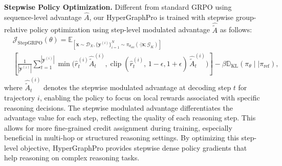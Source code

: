 

\noindent\textbf{Stepwise Policy Optimization.}
Different from standard GRPO using sequence-level advantage $\hat{A}$, our HyperGraphPro is trained with stepwise group-relative policy optimization using step-level modulated advantage $\hat{\tilde{A}}$ as follows:
\begin{equation}
\begin{split}
&\mathcal{J}_{\mathrm{StepGRPO}}(\theta)
= \mathbb{E}_{\left[\boldsymbol{x} \sim \mathcal{D}_X, \{\boldsymbol{y}^{(i)}\}_{i=1}^N \sim \pi_{\theta_{\text{old}}}(\cdot | \boldsymbol{x}; \mathcal{G}_K)\right]}
\\
&\left[
\frac{1}{\left\lvert\boldsymbol{y}^{(i)}\right\rvert}\sum_{t=1}^{\left\lvert \boldsymbol{y}^{(i)}\right\rvert}
\min\Big(
\hat{r}_{t}^{(i)}\hat{\tilde{A}}^{(i)}_t, \operatorname{clip}\!\left(\hat{r}_{t}^{(i)},\, 1 - \epsilon, 1+\epsilon \right)\,\hat{\tilde{{A}}}^{(i)}_t
\Big)
\right] -\beta \mathbb{D}_{\text{KL}}\left(\pi_\theta \mid\mid \pi_{\text{ref}} \right),
\end{split}
\end{equation}
where $\hat{\tilde{A}}^{(i)}_t$ denotes the stepwise modulated advantage at decoding step $t$ for trajectory $i$, enabling the policy to focus on local rewards associated with specific reasoning decisions.
The stepwise modulated advantage differentiates the advantage value for each step, reflecting the quality of each reasoning step.
This allows for more fine-grained credit assignment during training, especially beneficial in multi-hop or structured reasoning settings.
By optimizing this step-level objective, HyperGraphPro provides stepwise dense policy gradients that help reasoning on complex reasoning tasks.